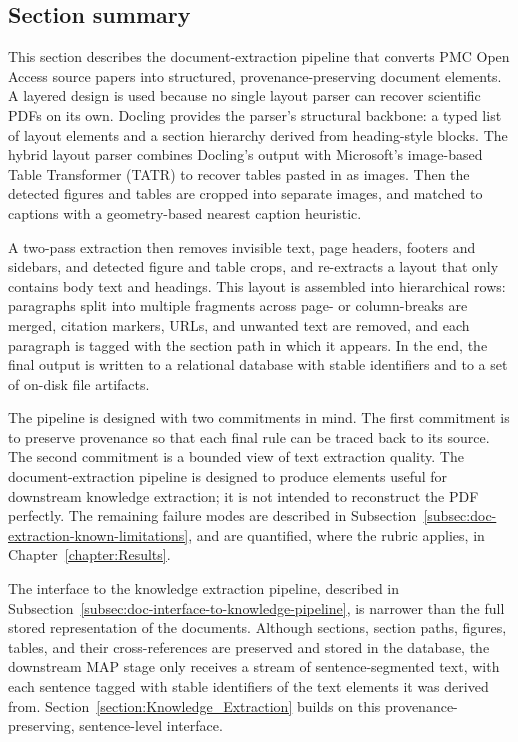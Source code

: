 \subsection{Section summary}\label{subsec:doc-extraction-section-summary}

This section describes the document-extraction pipeline that converts PMC Open Access source papers into structured, provenance-preserving document elements. A layered design is used because no single layout parser can recover scientific PDFs on its own. Docling provides the parser's structural backbone: a typed list of layout elements and a section hierarchy derived from heading-style blocks. The hybrid layout parser combines Docling's output with Microsoft's image-based Table Transformer (TATR) to recover tables pasted in as images. Then the detected figures and tables are cropped into separate images, and matched to captions with a geometry-based nearest caption heuristic. 

A two-pass extraction then removes invisible text, page headers, footers and sidebars, and detected figure and table crops, and re-extracts a layout that only contains body text and headings. This layout is assembled into hierarchical rows: paragraphs split into multiple fragments across page- or column-breaks are merged, citation markers, URLs, and unwanted text are removed, and each paragraph is tagged with the section path in which it appears. In the end, the final output is written to a relational database with stable identifiers and to a set of on-disk file artifacts. 

The pipeline is designed with two commitments in mind. The first commitment is to preserve provenance so that each final rule can be traced back to its source. The second commitment is a bounded view of text extraction quality. The document-extraction pipeline is designed to produce elements useful for downstream knowledge extraction; it is not intended to reconstruct the PDF perfectly. The remaining failure modes are described in Subsection~\ref{subsec:doc-extraction-known-limitations}, and are quantified, where the rubric applies, in Chapter~\ref{chapter:Results}. 

The interface to the knowledge extraction pipeline, described in Subsection~\ref{subsec:doc-interface-to-knowledge-pipeline}, is narrower than the full stored representation of the documents. Although sections, section paths, figures, tables, and their cross-references are preserved and stored in the database, the downstream MAP stage only receives a stream of sentence-segmented text, with each sentence tagged with stable identifiers of the text elements it was derived from. Section~\ref{section:Knowledge_Extraction} builds on this provenance-preserving, sentence-level interface.